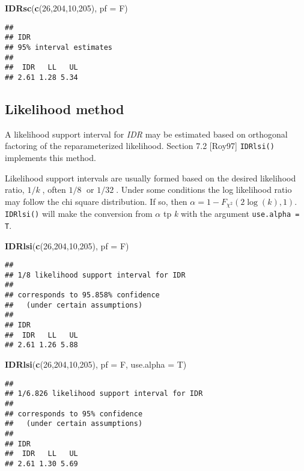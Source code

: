\documentclass[]{article}
\newenvironment{Shaded}{\begin{snugshade}}{\end{snugshade}}
\newcommand{\KeywordTok}[1]{\textcolor[rgb]{0.13,0.29,0.53}{\textbf{{#1}}}}
\newcommand{\DataTypeTok}[1]{\textcolor[rgb]{0.13,0.29,0.53}{{#1}}}
\newcommand{\DecValTok}[1]{\textcolor[rgb]{0.00,0.00,0.81}{{#1}}}
\newcommand{\NormalTok}[1]{{#1}}
\begin{document}
\bigskip

\begin{Shaded}
\begin{Highlighting}[]
\KeywordTok{IDRsc}\NormalTok{(}\KeywordTok{c}\NormalTok{(}\DecValTok{26}\NormalTok{,}\DecValTok{204}\NormalTok{,}\DecValTok{10}\NormalTok{,}\DecValTok{205}\NormalTok{), }\DataTypeTok{pf =} \NormalTok{F)}
\end{Highlighting}
\end{Shaded}

\begin{verbatim}
## 
## IDR 
## 95% interval estimates
## 
##  IDR   LL   UL 
## 2.61 1.28 5.34
\end{verbatim}

\subsection{Likelihood method}

A likelihood support interval for \emph{IDR} may be estimated based on
orthogonal factoring of the reparameterized likelihood. Section 7.2
{[}Roy97{]} \texttt{IDRlsi()} implements this method.

Likelihood support intervals are usually formed based on the desired
likelihood ratio, \({1}/{k}\;\), often \({1}/{8}\;\) or \({1}/{32}\;\).
Under some conditions the log likelihood ratio may follow the chi square
distribution. If so, then
\(\alpha =1-{{F}_{{{\chi }^{2}}}}\left( 2\log (k),1 \right)\).
\texttt{IDRlsi()} will make the conversion from \(\alpha\) tp \emph{k}
with the argument \texttt{use.alpha = T}.

\bigskip

\begin{Shaded}
\begin{Highlighting}[]
\KeywordTok{IDRlsi}\NormalTok{(}\KeywordTok{c}\NormalTok{(}\DecValTok{26}\NormalTok{,}\DecValTok{204}\NormalTok{,}\DecValTok{10}\NormalTok{,}\DecValTok{205}\NormalTok{), }\DataTypeTok{pf =} \NormalTok{F)}
\end{Highlighting}
\end{Shaded}

\begin{verbatim}
## 
## 1/8 likelihood support interval for IDR 
## 
## corresponds to 95.858% confidence
##   (under certain assumptions)
## 
## IDR 
##  IDR   LL   UL 
## 2.61 1.26 5.88
\end{verbatim}

\begin{Shaded}
\begin{Highlighting}[]
\KeywordTok{IDRlsi}\NormalTok{(}\KeywordTok{c}\NormalTok{(}\DecValTok{26}\NormalTok{,}\DecValTok{204}\NormalTok{,}\DecValTok{10}\NormalTok{,}\DecValTok{205}\NormalTok{), }\DataTypeTok{pf =} \NormalTok{F, }\DataTypeTok{use.alpha =} \NormalTok{T)}
\end{Highlighting}
\end{Shaded}

\begin{verbatim}
## 
## 1/6.826 likelihood support interval for IDR 
## 
## corresponds to 95% confidence
##   (under certain assumptions)
## 
## IDR 
##  IDR   LL   UL 
## 2.61 1.30 5.69
\end{verbatim}




\end{document}
